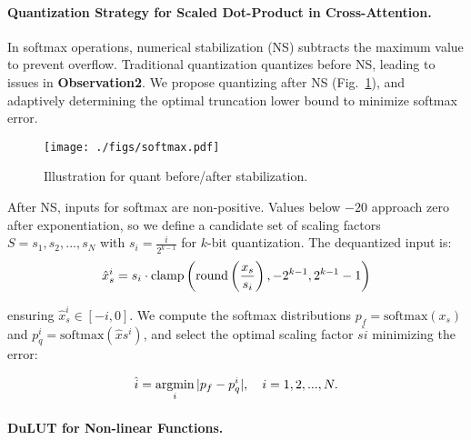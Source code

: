 \paragraph{Quantization Strategy for Scaled Dot-Product in Cross-Attention.}

In softmax operations, numerical stabilization (NS) subtracts the maximum value to prevent overflow. Traditional quantization quantizes before NS, leading to issues in \textbf{Observation2}. We propose quantizing after NS (Fig.~\ref{fig:illustration_for_quant_before_after_stabilization}), and adaptively determining the optimal truncation lower bound to minimize softmax error.

\begin{figure}[htb]
\centering
	\texttt{[image: ./figs/softmax.pdf]}
    \vspace{-4mm}
	\caption{Illustration for quant before/after stabilization.}
	\label{fig:illustration_for_quant_before_after_stabilization}
    \vspace{-7mm}
\end{figure}

After NS, inputs for softmax are non-positive. Values below $-20$ approach zero after exponentiation, so we define a candidate set of scaling factors $S = {s_1, s_2, ..., s_N}$ with $s_i = \frac{i}{2^{k-1}}$ for $k$-bit quantization. The dequantized input is:
\vspace{-3mm}
\begin{equation}
\vspace{-3mm}
\begin{aligned}
\hat{x}_s^i = s_i \cdot \text{clamp}\left( \text{round}\left( \frac{x_s}{s_i} \right), -2^{k-1}, 2^{k-1}-1 \right)
\end{aligned}
\end{equation}

ensuring $\hat{x}_s^i \in [-i, 0]$. We compute the softmax distributions $p_f = \text{softmax}(x_s)$ and $p_q^i = \text{softmax}(\hat{x}s^i)$, and select the optimal scaling factor $s{\hat{i}}$ minimizing the error:

\begin{equation}
\begin{aligned}
\hat{i} = \operatorname*{argmin}_{i} | p_f - p_q^i |, \quad i = 1,2,...,N.
\end{aligned}
\vspace{-4mm}
\end{equation}

\paragraph{DuLUT for Non-linear Functions.} 

